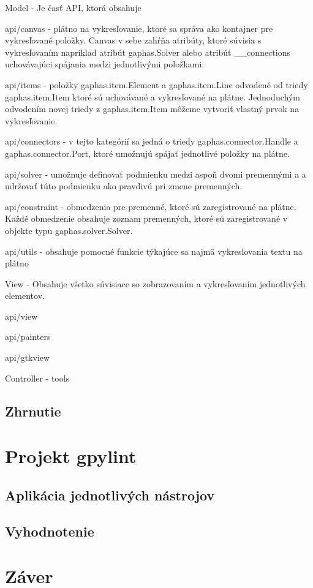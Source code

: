 \documentclass[11pt,oneside,final]{fithesis2}
\begin{document}
\begin{list}{•}{}

\item Model - Je časť API, ktorá obsahuje 

    \begin{list}{•}{}
    	\item api/canvas - plátno na vykresľovanie, ktoré sa správa ako kontajner pre vykresľované položky. Canvas v sebe zahŕňa atribúty, ktoré súvisia s vykresľovaním napríklad atribút gaphas.Solver alebo atribút \_\_connections uchovávajúci spájania medzi jednotlivými položkami.
    	\item api/items - položky gaphas.item.Element a gaphas.item.Line odvodené od triedy gaphas.item.Item ktoré sú uchovávané a vykresľované na plátne.
    	Jednoduchým odvodením novej triedy z gaphas.item.Item môžeme vytvoriť vlastný prvok na vykresľovanie.
    	\item api/connectors - v tejto kategórií sa jedná o triedy gaphas.connector.Handle a gaphas.connector.Port, ktoré umožnujú spájať jednotlivé položky na plátne.
    	\item api/solver - umožnuje definovať podmienku medzi aspoň dvomi premennými a a udržovať túto podmienku ako pravdivú pri zmene premenných.
 		\item api/constraint - obmedzenia pre premenné, ktoré sú zaregistrované na plátne. Každé obmedzenie obsahuje zoznam premenných, ktoré sú zaregistrované v objekte typu gaphas.solver.Solver. 
 		\item api/utils - obsahuje pomocné funkcie týkajúce sa najmä vykresľovania textu na plátno
    \end{list}


\item View - Obsahuje všetko súvisiace so zobrazovaním a vykresľovaním jednotlivých elementov.
    \begin{list}{•}{}
    \item api/view
    \item api/painters
    \item api/gtkview
    \end{list}


\item Controller - tools
\end{list}



\section{Zhrnutie}    
    
\chapter{Projekt gpylint}
	\section{Aplikácia jednotlivých nástrojov}
	\section{Vyhodnotenie}	

\chapter{Záver}
\end{document}
